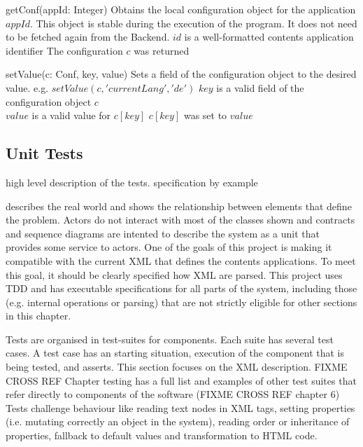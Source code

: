 \begin{sopcontract}{getConf(appId: Integer)}
{Obtains the local configuration object for the application $appId$. This object is stable during the execution of the program. It does not need to be fetched again from the Backend.}
{$id$ is a well-formatted contents application identifier}
{The configuration $c$ was returned}
\end{sopcontract}

\begin{sopcontract}{setValue(c: Conf, key, value)}
{Sets a field of the configuration object to the desired value. e.g. $setValue(c, 'currentLang', 'de')$}
{$key$ is a valid field of the configuration object $c$ \\ $value$ is a valid value for $c[key]$}
{$c[key]$ was set to $value$}
\end{sopcontract}

\subsection{Unit Tests}
high level description of the tests. specification by example

 describes the real world and shows the relationship between elements that define the problem.
Actors do not interact with most of the classes shown and contracts and sequence diagrams are intented to describe the system as a unit that provides some service to actors.
One of the goals of this project is making it compatible with the current \ac{XML} that defines the contents applications.
To meet this goal, it should be clearly specified how \ac{XML} are parsed.
This project uses \ac{TDD} and has executable specifications for all parts of the system, including those (e.g. internal operations or parsing) that are not strictly eligible for other sections in this chapter.

Tests are organised in test-suites for components.
Each suite has several test cases.
A test case has an starting situation, execution of the component that is being tested, and asserts.
This section focuses on the \ac{XML} description.
FIXME CROSS REF Chapter testing has a full list and examples of other test suites that refer directly to components of the software (FIXME CROSS REF  chapter 6)
Tests challenge behaviour like reading text nodes in \ac{XML} tags, setting properties (i.e. mutating correctly an object in the system), reading order or inheritance of properties, fallback to default values and transformation to \ac{HTML} code.

